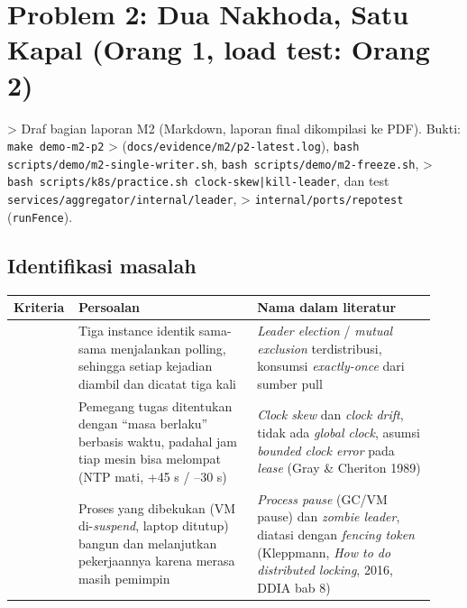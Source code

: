 \chapter{Problem 2: Dua Nakhoda, Satu Kapal (Orang 1, load test: Orang 2)}

> Draf bagian laporan M2 (Markdown, laporan final dikompilasi ke PDF). Bukti: \texttt{make demo-\allowbreak{}m2-\allowbreak{}p2} > (\texttt{docs/\allowbreak{}evidence/\allowbreak{}m2/\allowbreak{}p2-\allowbreak{}latest.\allowbreak{}log}), \texttt{bash scripts/\allowbreak{}demo/\allowbreak{}m2-\allowbreak{}single-\allowbreak{}writer.\allowbreak{}sh}, \texttt{bash scripts/\allowbreak{}demo/\allowbreak{}m2-\allowbreak{}freeze.\allowbreak{}sh}, > \texttt{bash scripts/\allowbreak{}k8s/\allowbreak{}practice.\allowbreak{}sh clock-\allowbreak{}skew|\allowbreak{}kill-\allowbreak{}leader}, dan test \texttt{services/\allowbreak{}aggregator/\allowbreak{}internal/\allowbreak{}leader}, > \texttt{internal/\allowbreak{}ports/\allowbreak{}repotest} (\texttt{run\allowbreak{}Fence}).


\section{Identifikasi masalah}

{\small
\begin{longtable}{@{}>{\raggedright\arraybackslash}p{0.112\linewidth}>{\raggedright\arraybackslash}p{0.411\linewidth}>{\raggedright\arraybackslash}p{0.411\linewidth}@{}}
\toprule
\textbf{Kriteria} & \textbf{Persoalan} & \textbf{Nama dalam literatur} \\
\midrule
\endhead
2 & Tiga instance identik sama-sama menjalankan polling, sehingga setiap kejadian diambil dan dicatat tiga kali & \emph{Leader election} / \emph{mutual exclusion} terdistribusi, konsumsi \emph{exactly-once} dari sumber pull \\
4 & Pemegang tugas ditentukan dengan ``masa berlaku'' berbasis waktu, padahal jam tiap mesin bisa melompat (NTP mati, +45 s / --30 s) & \emph{Clock skew} dan \emph{clock drift}, tidak ada \emph{global clock}, asumsi \emph{bounded clock error} pada \emph{lease} (Gray \& Cheriton 1989) \\
5 & Proses yang dibekukan (VM di-\emph{suspend}, laptop ditutup) bangun dan melanjutkan pekerjaannya karena merasa masih pemimpin & \emph{Process pause} (GC/VM pause) dan \emph{zombie leader}, diatasi dengan \emph{fencing token} (Kleppmann, \emph{How to do distributed locking}, 2016, DDIA bab 8) \\
\bottomrule
\end{longtable}
}

